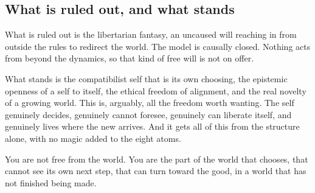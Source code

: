\subsection{What is ruled out, and what stands}

What is ruled out is the libertarian fantasy, an uncaused will reaching in from outside the rules to redirect the world. The model is causally closed. Nothing acts from beyond the dynamics, so that kind of free will is not on offer.

What stands is the compatibilist self that is its own choosing, the epistemic openness of a self to itself, the ethical freedom of alignment, and the real novelty of a growing world. This is, arguably, all the freedom worth wanting. The self genuinely decides, genuinely cannot foresee, genuinely can liberate itself, and genuinely lives where the new arrives. And it gets all of this from the structure alone, with no magic added to the eight atoms.

\begin{principle}
You are not free from the world. You are the part of the world that chooses, that cannot see its own next step, that can turn toward the good, in a world that has not finished being made.
\end{principle}
